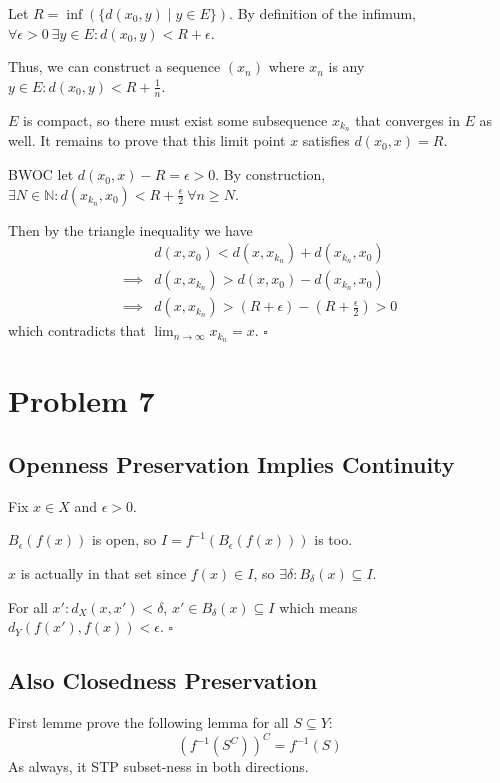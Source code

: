 \documentclass[12pt]{article}
\newcommand{\N}{\mathbb{N}}
\begin{document}
Let $R = \inf(\{d(x_0, y) \mid y \in E\})$.
By definition of the infimum, $\forall \epsilon > 0\ \exists y \in E: d(x_0, y) < R + \epsilon$.

Thus, we can construct a sequence $(x_n)$ where $x_n$ is any $y \in E: d(x_0, y) < R + \frac{1}{n}$.

$E$ is compact, so there must exist some subsequence $x_{k_n}$ that converges in $E$ as well.
It remains to prove that this limit point $x$ satisfies $d(x_0, x) = R$.

BWOC let $d(x_0, x) - R = \epsilon > 0$.
By construction, $\exists N \in \N: d(x_{k_n}, x_0) < R+\frac{\epsilon}{2}\ \forall n \ge N$.

Then by the triangle inequality we have
\begin{align*}
  & d(x, x_0) < d(x, x_{k_n}) + d(x_{k_n}, x_0) \\
  \implies{} & d(x, x_{k_n}) > d(x, x_0) - d(x_{k_n}, x_0) \\
  \implies{} & d(x, x_{k_n}) > (R + \epsilon) - \left(R + \frac{\epsilon}{2}\right) > 0
\end{align*}
which contradicts that $\lim_{n \to \infty} x_{k_n} = x$. $\square$

\pagebreak

\section{Problem 7}

\subsection{Openness Preservation Implies Continuity}

Fix $x \in X$ and $\epsilon > 0$.

$B_\epsilon(f(x))$ is open, so $I=f^{-1}(B_\epsilon(f(x)))$ is too.

$x$ is actually in that set since $f(x) \in I$, so $\exists \delta: B_\delta(x) \subseteq I$.

For all $x': d_X(x, x') < \delta$, $x' \in B_\delta(x) \subseteq I$
which means $d_Y(f(x'), f(x)) < \epsilon$. $\square$

\subsection{Also Closedness Preservation}

First lemme prove the following lemma for all $S \subseteq Y$:
\[\left(f^{-1}(S^C)\right)^C = f^{-1}(S)\]
As always, it STP subset-ness in both directions.
\end{document}
